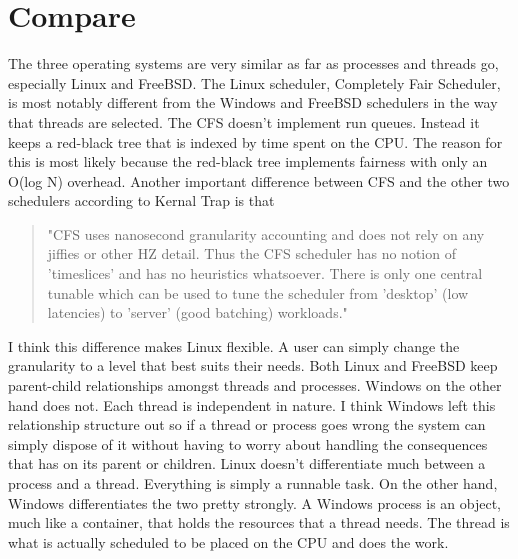 \documentclass[onecolumn,draftclsnofoot, 10pt, compsoc]{IEEEtran}
\begin{document}
\section{Compare}
	The three operating systems are very similar as far as processes and threads go, especially Linux and FreeBSD. 
	The Linux scheduler, Completely Fair Scheduler, is most notably different from the Windows and FreeBSD schedulers in the way that threads are selected. 
	The CFS doesn't implement run queues. 
	Instead it keeps a red-black tree that is indexed by time spent on the CPU. 
	The reason for this is most likely because the red-black tree implements fairness with only an O(log N) overhead. 
	Another important difference between CFS and the other two schedulers according to Kernal Trap is that 
	
		\begin{quote}
			"CFS uses nanosecond granularity accounting and does not rely on any jiffies or other HZ detail. Thus the CFS scheduler has no notion of 'timeslices' and has no heuristics whatsoever. There is only one central tunable which can be used to tune the scheduler from 'desktop' (low latencies) to 'server' (good batching) workloads."\cite{CFSTimeSliceDifference}
		\end{quote}
	
	I think this difference makes Linux flexible. A user can simply change the granularity to a level that best suits their needs.
	Both Linux and FreeBSD keep parent-child relationships amongst threads and processes. Windows on the other hand does not. 
	Each thread is independent in nature. I think Windows left this relationship structure out so if a thread or process goes wrong the system can simply dispose of it without having to worry about handling the consequences that has on its parent or children.
	Linux doesn't differentiate much between a process and a thread. 
	Everything is simply a runnable task. 
	On the other hand, Windows differentiates the two pretty strongly. 
	A Windows process is an object, much like a container, that holds the resources that a thread needs. 
	The thread is what is actually scheduled to be placed on the CPU and does the work.
	
	


\end{document}
